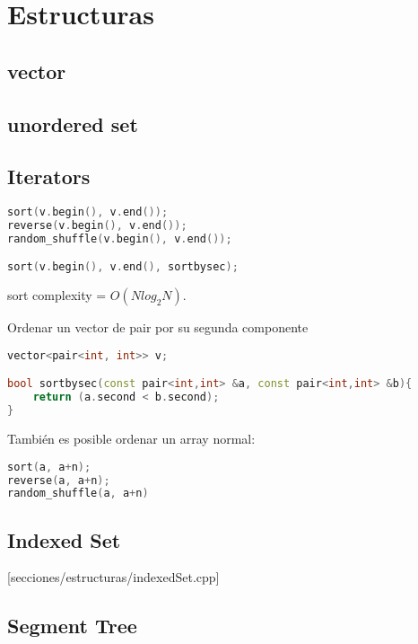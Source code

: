 \newpage
\section{Estructuras}

\subsection{vector}


\subsection{unordered set}


\subsection{Iterators}
\begin{lstlisting}[language=C++]
sort(v.begin(), v.end());
reverse(v.begin(), v.end());
random_shuffle(v.begin(), v.end());

sort(v.begin(), v.end(), sortbysec);
\end{lstlisting}

sort complexity = $O(N log_2 N)$.

Ordenar un vector de pair por su segunda componente
\begin{lstlisting}[language=C++]
vector<pair<int, int>> v;

bool sortbysec(const pair<int,int> &a, const pair<int,int> &b){
	return (a.second < b.second);
}
\end{lstlisting}

También es posible ordenar un array normal:
\begin{lstlisting}[language=C++]
sort(a, a+n);
reverse(a, a+n);
random_shuffle(a, a+n)
\end{lstlisting}

\subsection{Indexed Set}
[secciones/estructuras/indexedSet.cpp]

\subsection{Segment Tree}

